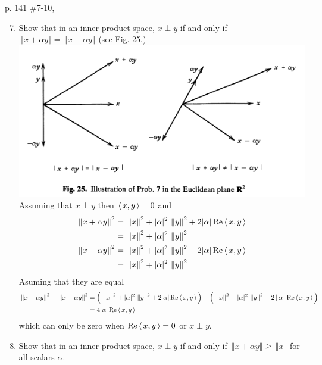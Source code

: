 \documentclass[10pt,a4paper]{report}
\newcommand{\NORM}[1]{\,\left \Vert #1 \right \Vert}
\begin{document}
\newpage
p. 141 \#7-10, 
\begin{enumerate}
	\setcounter{enumi}{6}
	\item Show that in an inner product space, $x \perp y$ if and only if $\NORM{x+\alpha y}=\NORM{x-\alpha y}$ (see Fig. 25.)\\
	\includegraphics[scale=0.8]{711_03_fig25.png} \\
	Assuming that $x \perp y$ then $\left \langle\, x,y \,\right \rangle = 0$ and
	\begin{align*}
		\NORM{x+\alpha y}^2 &= \NORM{x}^2 + |\alpha|^2\NORM{y}^2 +2|\alpha|\RR\ABRACKET{x,y} \\
		&= \NORM{x}^2 + |\alpha|^2\NORM{y}^2 \\
		\NORM{x-\alpha y}^2 &= \NORM{x}^2 + |\alpha|^2\NORM{y}^2 -2|\alpha|\RR\ABRACKET{x,y} \\
		&= \NORM{x}^2 + |\alpha|^2\NORM{y}^2
	\end{align*}Asuming that they are equal
	\begin{align*}
		\NORM{x+\alpha y}^2-\NORM{x-\alpha y}^2 &= \PAREN{\NORM{x}^2 + |\alpha|^2\NORM{y}^2 +2|\alpha|\RR\ABRACKET{x,y}} - \PAREN{\NORM{x}^2 + |\alpha|^2\NORM{y}^2 -2\BARS{\alpha}\RR\ABRACKET{x,y}} \\
		&= 4|\alpha|\RR\ABRACKET{x,y}
	\end{align*}which can  only be zero when $\operatorname{Re}\left \langle\, x,y \,\right \rangle=0$ or $x \perp y$.
	
	\item Show that in an inner product space, $x \perp y$ if and only if $\NORM{x+\alpha y}\ge \NORM{x}$ for all scalars $\alpha$.\\
	

\end{enumerate}
\end{document}
